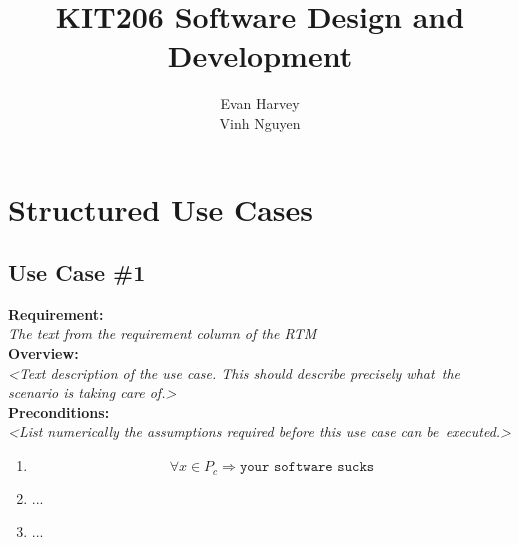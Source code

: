 \documentclass[12pt,english]{article}     %
\begin{document}
 
\title{KIT206 Software Design and Development}
\author{Evan Harvey\\Vinh Nguyen}
\maketitle 

\newpage{}
\tableofcontents{}
\listoffigures	

\newpage{}
\section{Structured Use Cases}

\subsection{Use Case \#1}
\textbf{Requirement:}
\\
\textit{The text from the requirement column of the RTM}
\\
\textbf{Overview:}
\\
\textit{<Text description of the use case. This should describe precisely what\
	the scenario is taking care of.>}
\\
\textbf{Preconditions:}
\\
\textit{<List numerically the assumptions required before this use case can be\
	executed.>}
\\
\begin{enumerate}
	\item \[\forall{x} \in {P_c} \Longrightarrow \texttt{your software sucks}\]
\item ...
\item ...
\end{enumerate}
\end{document}
